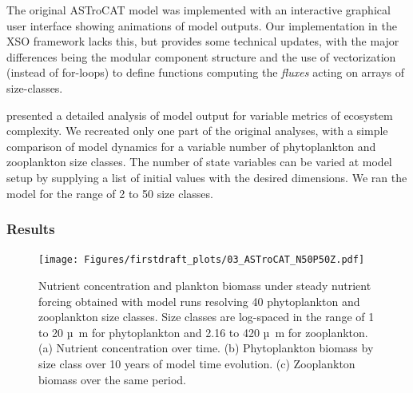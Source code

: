\documentclass[gmd, manuscript]{copernicus}
\begin{document}
The original ASTroCAT model was implemented with an interactive graphical user interface showing animations of model outputs. Our implementation in the XSO framework lacks this, but provides some technical updates, with the major differences being the modular component structure and the use of vectorization (instead of for-loops) to define functions computing the \textit{fluxes} acting on arrays of size-classes.

\citet{Banas2011b} presented a detailed analysis of model output for variable metrics of ecosystem complexity. We recreated only one part of the original analyses, with a simple comparison of model dynamics for a variable number of phytoplankton and zooplankton size classes. The number of state variables can be varied at model setup by supplying a list of initial values with the desired dimensions. We ran the model for the range of 2 to 50 size classes.

\subsubsection{Results}
\begin{figure}[t]
\texttt{[image: Figures/firstdraft\_plots/03\_ASTroCAT\_N50P50Z.pdf]}
\caption{Nutrient concentration and plankton biomass under steady nutrient forcing obtained with model runs resolving 40 phytoplankton and zooplankton size classes. Size classes are log-spaced in the range of 1 to 20 \unit{µ m} for phytoplankton and 2.16 to 420 \unit{µ m} for zooplankton. (a) Nutrient concentration over time. (b) Phytoplankton biomass by size class over 10 years of model time evolution. (c) Zooplankton biomass over the same period.}
\label{Figure:ResultsASTroCAT_1}
\end{figure}
\end{document}
